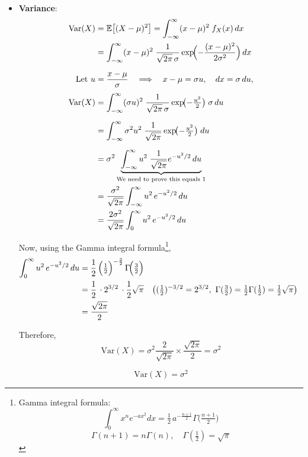 \documentclass[twoside]{book}
\begin{document}
\begin{itemize}
    \item \textbf{Variance}:
    \begin{align*}
    \operatorname{Var}(X)
    &= \mathbb{E}\bigl[(X - \mu)^2\bigr]
    = \int_{-\infty}^{\infty} (x - \mu)^2 \; f_X(x)\,dx \\
    &= \int_{-\infty}^{\infty} (x - \mu)^2 \;\frac{1}{\sqrt{2\pi}\,\sigma}
    \exp\!\Bigl(-\frac{(x-\mu)^2}{2\sigma^2}\Bigr)\,dx \\[6pt]
    \text{Let } u &= \frac{x - \mu}{\sigma}
    \quad\Longrightarrow\quad
    x - \mu = \sigma u,
    \quad dx = \sigma\,du, \\[3pt]
    \operatorname{Var}(X)&= \int_{-\infty}^{\infty}
    (\sigma u)^2 \;
    \frac{1}{\sqrt{2\pi}\,\sigma}
    \exp\!\bigl(-\tfrac{u^2}{2}\bigr)\;\sigma\,du \\[6pt]
    &= \int_{-\infty}^{\infty}
    \sigma^2 u^2 \;
    \frac{1}{\sqrt{2\pi}}
    \exp\!\bigl(-\tfrac{u^2}{2}\bigr)\;du \\[6pt]
    &= \sigma^2 \underbrace{\int_{-\infty}^{\infty}
            u^2 \;\frac{1}{\sqrt{2\pi}} e^{-u^2/2}\,du}_{\text{We need to prove this equals 1}}\\
    &= \frac{\sigma^2}{\sqrt{2\pi}} \int_{-\infty}^{\infty} u^2\,e^{-u^2/2}\,du\\
    &= \frac{2\sigma^2}{\sqrt{2\pi}} \int_{0}^{\infty} u^2\,e^{-u^2/2}\,du\
    \end{align*}

    Now, using the Gamma integral formula\footnote{Gamma integral formula:
    $$\int_{0}^{\infty} x^n e^{-a x^2}dx
         = \tfrac12\,a^{-\frac{n+1}{2}}\Gamma\!\bigl(\tfrac{n+1}{2}\bigr)$$
         $$\Gamma(n+1) = n\Gamma(n), \quad \Gamma(\tfrac12) = \sqrt{\pi}$$
         },
    \begin{align*}
    \int_{0}^{\infty} u^2\,e^{-u^2/2}\,du
    &= \frac{1}{2}\,\Bigl(\tfrac12\Bigr)^{-\frac{3}{2}}
       \,\Gamma\!\Bigl(\tfrac{3}{2}\Bigr)\\
    &= \frac{1}{2}\,\cdot 2^{3/2}\,\cdot \frac{1}{2}\sqrt{\pi}
    &&\bigl((\tfrac12)^{-3/2}=2^{3/2},\ \Gamma(\tfrac32)=\tfrac12\Gamma(\tfrac12) = \tfrac12\sqrt\pi\bigr)\\
    &= \frac{\sqrt{2\pi}}{2}
    \end{align*}

    Therefore,
    \[
    \text{Var}(X) = \sigma^2 \frac{2}{\sqrt{2\pi}} \times \frac{\sqrt{2\pi}}{2}
      = \sigma^2
    \]

        \begin{textbox}
        \[
        \text{Var}(X) = \sigma^2
        \]
        \end{textbox}
\end{itemize}
\end{document}
